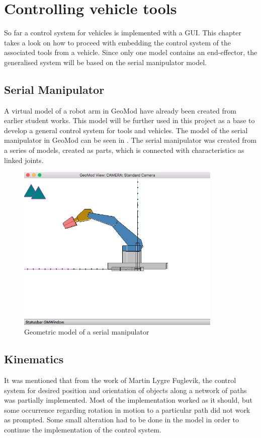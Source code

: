 \chapter{Controlling vehicle tools}

So far a control system for vehicles is implemented with a GUI. This chapter takes a look on how to proceed with embedding the control system of the associated tools from a vehicle. Since only one model contains an end-effector, the generalised system will be based on the serial manipulator model.

\section{Serial Manipulator}

A virtual model of a robot arm in GeoMod have already been created from earlier student works. This model will be further used in this project as a base to develop a general control system for tools and vehicles. The model of the serial manipulator in GeoMod can be seen in . The serial manipulator was created from a series of models, created as parts, which is connected with characteristics as linked joints.

\begin{figure}[ht]
    \centering
    \includegraphics[height=8cm]{images/GeometricModel.png}
    \caption[Geometric model of a serial manipulator]{Geometric model of a serial manipulator}
    \label{fig:SerialManipulator}
\end{figure}


\section{Kinematics}
It was mentioned that from the work of Martin Lygre Fuglevik, the control system for desired position and orientation of objects along a network of paths was partially implemented. Most of the implementation worked as it should, but some occurrence regarding rotation in motion to a particular path did not work as prompted. Some small alteration had to be done in the model in order to continue the implementation of the control system. 

